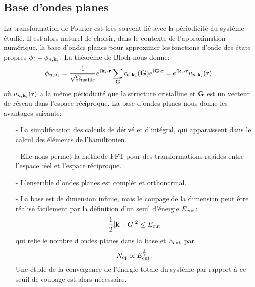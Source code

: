 \subsection{Base d'ondes planes}
\label{subsec-planewave}
La transformation de Fourier est très souvent lié avec la périodicité du système étudié.
Il est alors naturel de choisir, dans le contexte de l'approximation numérique,
la base d'ondes planes pour approximer les fonctions d'onde des états propres $\phi_i = \phi_{n,\vb{k}_i}$.
La théorème de Bloch nous donne:
\begin{equation*}
  \phi_{n,\vb{k}_i}
  = \frac{1}{\sqrt{\Omega_{\V{maille}}}}e^{i\vb{k}_i\vdot\vb{r}}\sum_{\vb{G}} c_{n,\vb{k}_i}(\vb{G})e^{i\vb{G}\vdot\vb{r}}
  = e^{i\vb{k}_i\vdot\vb{r}} u_{n,\vb{k}_i}(\vb{r})
\end{equation*}
où $u_{n,\vb{k}_i}(\vb{r})$ a la même périodicité que la structure cristalline
et $\vb{G}$ est un vecteur de réseau dans l'espace réciproque.
La base d'ondes planes nous donne les avantages suivants:
\begin{itemize}
  \item[-] La simplification des calculs de dérivé et d'intégral,
    qui apparaissent dans le calcul des éléments de l'hamiltonien.
  \item[-] Elle nous permet la méthode FFT pour des transformations rapides entre l'espace réel et l'espace réciproque.
  \item[-] L'ensemble d'ondes planes est complèt et orthonormal.
  \item[-] La base est de dimension infinie, mais le coupage de la dimension peut être réalisé facilement
    par la définition d'un seuil d'énergie $E_{\textnormal{cut}}$:
    \begin{equation}
      \frac{1}{2}|\vb{k}+G|^2 \leq E_{\textnormal{cut}}
    \end{equation}
    qui relie le nombre d'ondes planes dans la base et $E_{\textnormal{cut}}$ par
    \begin{equation}
      N_{\textnormal{op}}\propto E_{\textnormal{cut}}^{\frac{3}{2}}.
    \end{equation}
    Une étude de la convergence de l'énergie totale du système par rapport à ce seuil de coupage est alors nécessaire.
\end{itemize}


